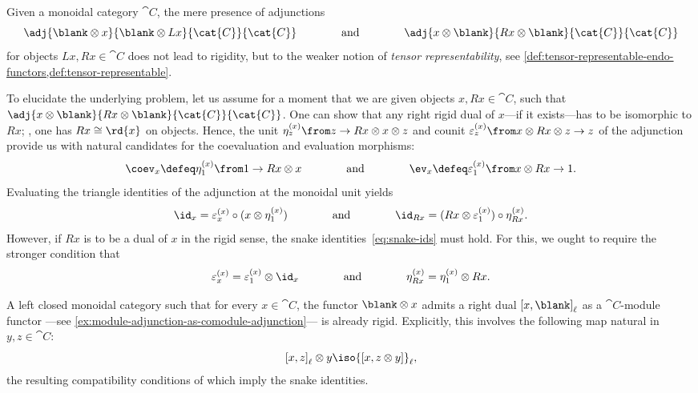 \begin{remark}\label{rmk:trep-is-not-rigid-first-exposure}
  Given a monoidal category \(\cat{C}\),
  the mere presence of adjunctions
  \[
    \adj{\blank \otimes x}{\blank \otimes Lx}{\cat{C}}{\cat{C}}
    \qquad\qquad\text{and}\qquad\qquad
    \adj{x \otimes \blank}{ Rx \otimes \blank}{\cat{C}}{\cat{C}}
  \]
  for objects \(Lx, Rx \in \cat{C}\) does not lead to rigidity,
  but to the weaker notion of \emph{tensor representability}, see \cref{def:tensor-representable-endo-functors,def:tensor-representable}.

  To elucidate the underlying problem,
  let us assume for a moment that we are given objects \(x, Rx \in \cat{C}\),
  such that \(\adj{x \otimes \blank }{Rx \otimes\blank}{\cat{C}}{\cat{C}}\).
  One can show that any right rigid dual of \(x\)—if it exists—has to be isomorphic to \(Rx\);
  \ie, one has \(Rx \cong \rd{x}\) on objects.
  Hence, the unit \(\eta^{(x)}_{z} \from z \to Rx \otimes x \otimes z\) and counit \(\varepsilon^{(x)}_{z} \from x \otimes Rx \otimes z \to z \) of the adjunction provide us with natural candidates for the coevaluation and evaluation morphisms:
  \[
    \coev_x \defeq \eta^{(x)}_1 \from 1 \to Rx \otimes x \qquad \qquad \text{and} \qquad \qquad \ev_x \defeq \varepsilon^{(x)}_1 \from x \otimes Rx \to 1.
  \]
  Evaluating the triangle identities of the adjunction at the monoidal unit yields
  \[
    \id_{x} = \varepsilon^{(x)}_{x} \circ (x \otimes \eta^{(x)}_1)
    \qquad\qquad\text{and}\qquad\qquad
    \id_{Rx} = (Rx \otimes \varepsilon^{(x)}_1) \circ \eta^{(x)}_{Rx}.
  \]
  However, if \(Rx\) is to be a dual of \(x\) in the rigid sense,
  the snake identities~\eqref{eq:snake-ids} must hold.
  For this, we ought to require the stronger condition that
  \[
    \varepsilon^{(x)}_x = \varepsilon^{(x)}_1 \otimes \id_x
    \qquad\qquad\text{and}\qquad\qquad
    \eta^{(x)}_{Rx} = \eta^{(x)}_1 \otimes Rx.
  \]
\end{remark}

\begin{remark}
  A left closed monoidal category such that for every \(x \in \cat{C}\),
  the functor \(\blank \otimes x\)
  admits a right dual \({[x, \blank]}_{\ell}\) as a \(\cat{C}\)\hyp{}module functor%
  —see \cref{ex:module-adjunction-as-comodule-adjunction}—%
  is already rigid.
  Explicitly, this involves the following map natural in \(y, z \in \cat{C}\):
  \[
    {[x, z]}_{\ell} \otimes y \iso {[x, z \otimes y]}_{\ell},
  \]
  the resulting compatibility conditions of which imply the snake identities.
\end{remark}

